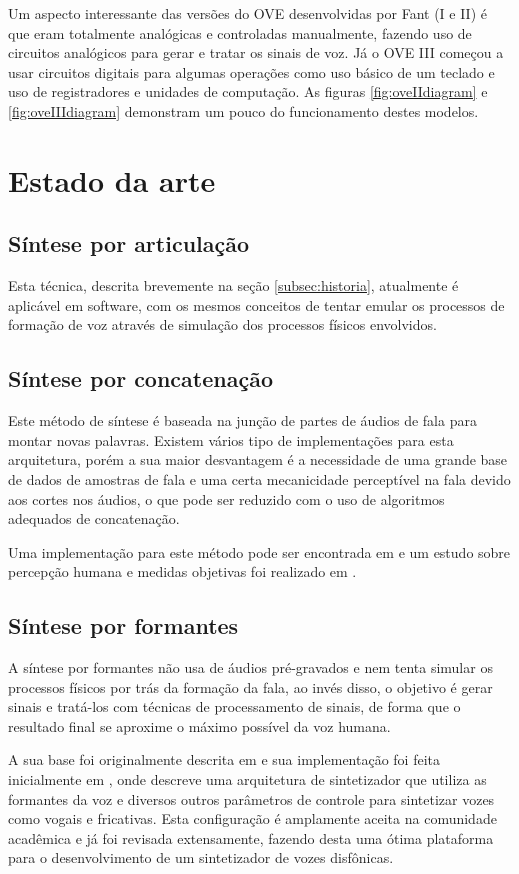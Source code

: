 \documentclass[
  12pt,       
  openright,      
  twoside,      
  a4paper,      
  english,      
  french,       
  spanish,      
  brazil,     
  ]{abntex2}
\begin{document}
Um aspecto interessante das versões do OVE desenvolvidas por Fant (I e II) é que eram totalmente analógicas e controladas manualmente, fazendo uso de circuitos analógicos para gerar e tratar os sinais de voz. Já o OVE III começou a usar circuitos digitais para algumas operações como uso básico de um teclado e uso de registradores e unidades de computação. As figuras \ref{fig:oveIIdiagram} e \ref{fig:oveIIIdiagram} demonstram um pouco do funcionamento destes modelos.

\section{Estado da arte}
\subsection{Síntese por articulação}
Esta técnica, descrita brevemente na seção \ref{subsec:historia}, atualmente é aplicável em software, com os mesmos conceitos de tentar emular os processos de formação de voz através de simulação dos processos físicos envolvidos.

\subsection{Síntese por concatenação}
Este método de síntese é baseada na junção de partes de áudios de fala para montar novas palavras. Existem vários tipo de implementações para esta arquitetura, porém a sua maior desvantagem é a necessidade de uma grande base de dados de amostras de fala e uma certa mecanicidade perceptível na fala devido aos cortes nos áudios, o que pode ser reduzido com o uso de algoritmos adequados de concatenação.

Uma implementação para este método pode ser encontrada em  e um estudo sobre percepção humana e medidas objetivas foi realizado em .

\subsection{Síntese por formantes}
A síntese por formantes não usa de áudios pré-gravados e nem tenta simular os processos físicos por trás da formação da fala, ao invés disso, o objetivo é gerar sinais e tratá-los com técnicas de processamento de sinais, de forma que o resultado final se aproxime o máximo possível da voz humana.

A sua base foi originalmente descrita em  e sua implementação foi feita inicialmente em , onde descreve uma arquitetura de sintetizador que utiliza as formantes da voz e diversos outros parâmetros de controle para sintetizar vozes como vogais e fricativas. Esta configuração é amplamente aceita na comunidade acadêmica e já foi revisada extensamente, fazendo desta uma ótima plataforma para o desenvolvimento de um sintetizador de vozes disfônicas.
\end{document}
